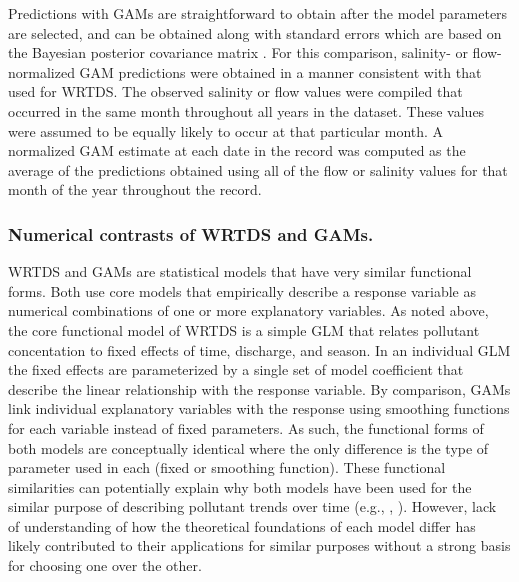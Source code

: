 \documentclass[letterpaper,12pt,oneside]{article}\usepackage[]{graphicx}\usepackage[]{color}
\begin{document}
Predictions with \acp{GAM} are straightforward to obtain after the model parameters are selected, and can be obtained along with standard errors which are based on the Bayesian posterior covariance matrix \citep{Wood06}. For this comparison, salinity- or flow-normalized \ac{GAM} predictions were obtained in a manner consistent with that used for \ac{WRTDS}. The observed salinity or flow values were compiled that occurred in the same month throughout all years in the dataset. These values were assumed to be equally likely to occur at that particular month.  A normalized \ac{GAM} estimate at each date in the record was computed as the average of the predictions obtained using all of the flow or salinity values for that month of the year throughout the record. 

\subsubsection*{\hspace*{0.25in} Numerical contrasts of \ac{WRTDS} and \acp{GAM}.}

\ac{WRTDS} and \acp{GAM} are statistical models that have very similar functional forms. Both use core models that empirically describe a response variable as numerical combinations of one or more explanatory variables.  As noted above, the core functional model of \ac{WRTDS} is a simple \ac{GLM} that relates pollutant concentation to fixed effects of time, discharge, and season.  In an individual \ac{GLM} the fixed effects are parameterized by a single set of model coefficient that describe the linear relationship with the response variable.  By comparison, \acp{GAM} link individual explanatory variables with the response using smoothing functions for each variable instead of fixed parameters. As such, the functional forms of both models are conceptually identical where the only difference is the type of parameter used in each (fixed or smoothing function).  These functional similarities can potentially explain why both models have been used for the similar purpose of describing pollutant trends over time (e.g., \citealt{USGS15}, \citealt{Harding16}).  However, lack of understanding of how the theoretical foundations of each model differ has likely contributed to their applications for similar purposes without a strong basis for choosing one over the other. 
\end{document}
